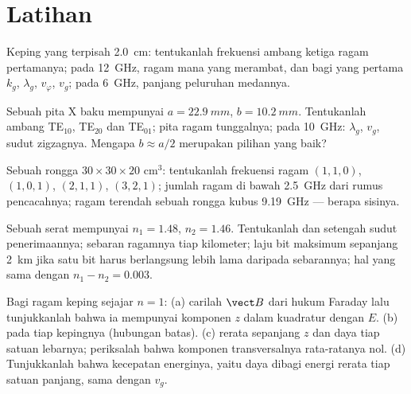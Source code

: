 \section{Latihan}

\begin{exercise}[$\star$]\label{exo:b2:guided-waves:1}
Keping yang terpisah \qty{2.0}{cm}: tentukanlah frekuensi ambang ketiga ragam pertamanya;
pada \qty{12}{GHz}, ragam mana yang merambat, dan bagi yang pertama $k_g$,
$\lambda_g$, $v_\varphi$, $v_g$; pada \qty{6}{GHz}, panjang peluruhan medannya.
\end{exercise}

\begin{exercise}[$\star$]\label{exo:b2:guided-waves:2}
Sebuah  pita X baku mempunyai $a = \qty{22.9}{mm}$, $b = \qty{10.2}{mm}$.
Tentukanlah ambang TE$_{10}$, TE$_{20}$ dan TE$_{01}$; pita ragam tunggalnya; pada
\qty{10}{GHz}: $\lambda_g$, $v_g$, sudut zigzagnya. Mengapa $b \approx a/2$
merupakan pilihan yang baik?
\end{exercise}

\begin{exercise}[$\star$]\label{exo:b2:guided-waves:3}
Sebuah rongga $30 \times 30 \times 20$ cm$^3$: tentukanlah frekuensi ragam $(1,1,0)$,
$(1,0,1)$, $(2,1,1)$, $(3,2,1)$; jumlah ragam di bawah \qty{2.5}{GHz} dari
rumus pencacahnya; ragam terendah sebuah rongga kubus \qty{9.19}{GHz}
--- berapa sisinya.
\end{exercise}

\begin{exercise}[$\star$]\label{exo:b2:guided-waves:4}
Sebuah serat mempunyai $n_1 = 1.48$, $n_2 = 1.46$. Tentukanlah  dan
setengah sudut penerimaannya; sebaran ragamnya tiap kilometer; laju bit maksimum sepanjang
\qty{2}{km} jika satu bit harus berlangsung lebih lama daripada sebarannya; hal yang sama dengan
$n_1 - n_2 = 0.003$.
\end{exercise}

\begin{exercise}[$\star\star$]\label{exo:b2:guided-waves:5}
Bagi ragam keping sejajar $n = 1$: (a) carilah $\vect B$ dari hukum
Faraday lalu tunjukkanlah bahwa ia mempunyai komponen $z$ dalam kuadratur dengan $E$. (b)  pada tiap kepingnya (hubungan batas). (c)  rerata
sepanjang $z$ dan daya tiap satuan lebarnya; periksalah bahwa komponen
transversalnya rata-ratanya nol. (d) Tunjukkanlah bahwa kecepatan energinya, yaitu daya
dibagi energi rerata tiap satuan panjang, sama dengan $v_g$.
\end{exercise}

